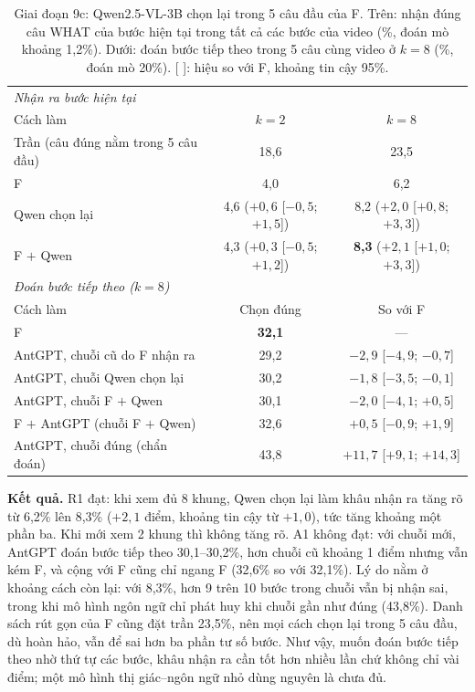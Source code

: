 \documentclass[a4paper,oneside]{report}
\begin{document}
\begin{table}[ht]
\centering
\caption{Giai đoạn 9c: Qwen2.5-VL-3B chọn lại trong 5 câu đầu của F. Trên: nhận đúng câu WHAT của bước hiện tại trong tất cả các bước của video (\%, đoán mò khoảng 1,2\%). Dưới: đoán bước tiếp theo trong 5 câu cùng video ở $k=8$ (\%, đoán mò 20\%). [ ]: hiệu so với F, khoảng tin cậy 95\%.}
\label{tab:stage9c}
\small
\begin{tabular}{lcc}
\toprule
\multicolumn{3}{l}{\textit{Nhận ra bước hiện tại}} \\
Cách làm & $k=2$ & $k=8$ \\
\midrule
Trần (câu đúng nằm trong 5 câu đầu) & 18,6 & 23,5 \\
F & 4,0 & 6,2 \\
Qwen chọn lại & 4,6 \;($+0{,}6$ [$-0{,}5$; $+1{,}5$]) & 8,2 \;($+2{,}0$ [$+0{,}8$; $+3{,}3$]) \\
F $+$ Qwen & 4,3 \;($+0{,}3$ [$-0{,}5$; $+1{,}2$]) & \textbf{8,3} \;($+2{,}1$ [$+1{,}0$; $+3{,}3$]) \\
\midrule
\multicolumn{3}{l}{\textit{Đoán bước tiếp theo ($k=8$)}} \\
Cách làm & Chọn đúng & So với F \\
\midrule
F & \textbf{32,1} & --- \\
AntGPT, chuỗi cũ do F nhận ra & 29,2 & $-2{,}9$ [$-4{,}9$; $-0{,}7$] \\
AntGPT, chuỗi Qwen chọn lại & 30,2 & $-1{,}8$ [$-3{,}5$; $-0{,}1$] \\
AntGPT, chuỗi F $+$ Qwen & 30,1 & $-2{,}0$ [$-4{,}1$; $+0{,}5$] \\
F $+$ AntGPT (chuỗi F $+$ Qwen) & 32,6 & $+0{,}5$ [$-0{,}9$; $+1{,}9$] \\
AntGPT, chuỗi đúng (chẩn đoán) & 43,8 & $+11{,}7$ [$+9{,}1$; $+14{,}3$] \\
\bottomrule
\end{tabular}
\end{table}

\textbf{Kết quả.} R1 đạt: khi xem đủ 8 khung, Qwen chọn lại làm khâu nhận ra tăng rõ từ 6,2\% lên 8,3\% ($+2{,}1$ điểm, khoảng tin cậy từ $+1{,}0$), tức tăng khoảng một phần ba. Khi mới xem 2 khung thì không tăng rõ. A1 không đạt: với chuỗi mới, AntGPT đoán bước tiếp theo 30,1--30,2\%, hơn chuỗi cũ khoảng 1 điểm nhưng vẫn kém F, và cộng với F cũng chỉ ngang F (32,6\% so với 32,1\%). Lý do nằm ở khoảng cách còn lại: với 8,3\%, hơn 9 trên 10 bước trong chuỗi vẫn bị nhận sai, trong khi mô hình ngôn ngữ chỉ phát huy khi chuỗi gần như đúng (43,8\%). Danh sách rút gọn của F cũng đặt trần 23,5\%, nên mọi cách chọn lại trong 5 câu đầu, dù hoàn hảo, vẫn để sai hơn ba phần tư số bước. Như vậy, muốn đoán bước tiếp theo nhờ thứ tự các bước, khâu nhận ra cần tốt hơn nhiều lần chứ không chỉ vài điểm; một mô hình thị giác--ngôn ngữ nhỏ dùng nguyên là chưa đủ.
\end{document}
